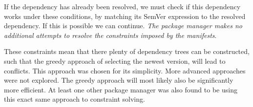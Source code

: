 If the dependency has already been resolved, we must check if this dependency
works under these conditions, by matching its SemVer expression to the resolved
dependency. If this is possible we can continue. \emph{The package manager
    makes no additional attempts to resolve the constraints imposed by the
        manifests}.

These constraints mean that there plenty of dependency trees can be
constructed, such that the greedy approach of selecting the newest version,
    will lead to conflicts. This approach was chosen for its simplicity. More
    advanced approaches were not explored. The greedy approach will most likely
    also be significantly more efficient. At least one other package manager
    was also found to be using this exact same approach to constraint
    solving\cite{YARNA}.
